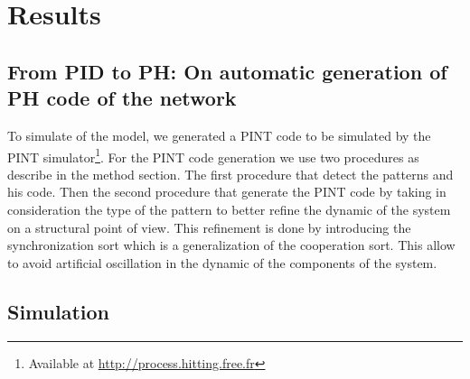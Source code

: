 
\section{Results}

\subsection{From PID to PH: On automatic generation of PH code of the network}

To simulate of the model, we generated a PINT code to be simulated by the PINT simulator\footnote{Available at \url{http://process.hitting.free.fr}}. 
For the PINT code generation we use two procedures as describe in the method section. The first procedure that detect the patterns and his code. Then the second 
procedure that generate the PINT code by taking in consideration the type of the pattern to better refine the dynamic of the system on a structural point of view.
This refinement is done by introducing the synchronization sort  which is a generalization of the cooperation sort. This allow  to avoid artificial oscillation
in the dynamic of the components of the system.




\subsection{Simulation}

